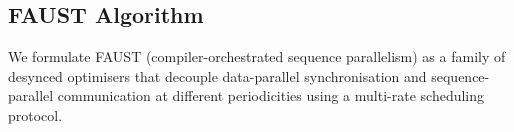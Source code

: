 \documentclass{article}
\begin{document}
\subsection{FAUST Algorithm}
\label{sec:desloc_algorithm}




We formulate FAUST (compiler-orchestrated sequence parallelism)
as a family of desynced optimisers that decouple data-parallel synchronisation and sequence-parallel
communication at different periodicities using a multi-rate scheduling protocol. 

\end{document}
